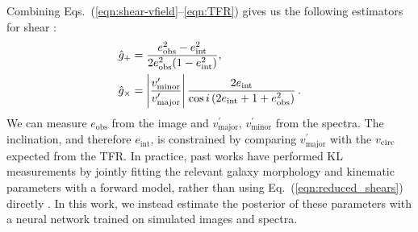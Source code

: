 Combining Eqs.~(\ref{eqn:shear-vfield}--\ref{eqn:TFR}) gives us the following estimators for shear \citep{KL, KLDESI}:
\begin{equation}
\label{eqn:reduced_shears}
    \begin{aligned}
    \hat{g}_+ &= \frac{e_{\mathrm{obs}}^2-e_{\mathrm{int}}^2}{2e_{\mathrm{obs}}^2(1-e_{\mathrm{int}}^2)},\\
    \hat{g}_\times&= \left|\frac{v_{\mathrm{minor}}^\prime}{v_{\mathrm{major}}^\prime}\right|\frac{2e_{\mathrm{int}}}{\cos{i}\,(2e_{\mathrm{int}}+1+e_{\mathrm{obs}}^2)}\,.
    \end{aligned}
\end{equation}
We can measure $e_\mathrm{obs}$ from the image and $v^\prime_\mathrm{major}$, $v^\prime_\mathrm{minor}$ from the spectra. The inclination, and therefore $e_\mathrm{int}$, is constrained by comparing $v^\prime_\mathrm{major}$ with the $v_\mathrm{circ}$ expected from the TFR. In practice, past works have performed KL measurements by jointly fitting the relevant galaxy morphology and kinematic parameters with a forward model, rather than using Eq.~(\ref{eqn:reduced_shears}) directly \citep{KLInferenceI, KLRoman, KLDESI}. In this work, we instead estimate the posterior of these parameters with a neural network trained on simulated images and spectra.
